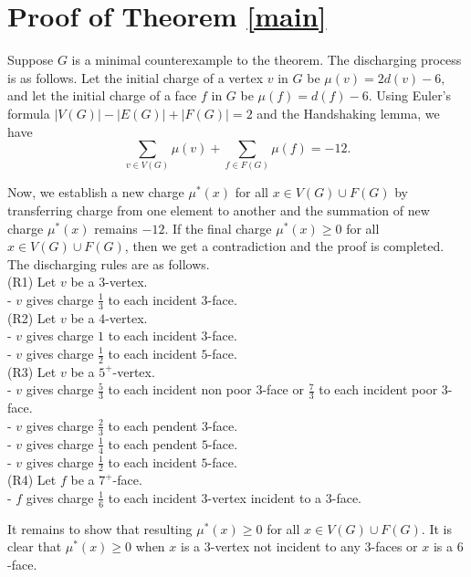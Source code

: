 \documentclass[11pt]{amsart} %
\theoremstyle{definition}
\begin{document}
\section{Proof of Theorem \ref{main}}

\indent Suppose $G$ is a minimal counterexample to the theorem. 
The discharging process is as follows. 
Let the initial charge of a vertex $v$ in $G$ be $\mu(v)=2d(v)-6,$ 
and let the initial charge of a face $f$ in $G$ be $\mu(f)=d(f)-6$. 
Using Euler's formula $|V(G)|-|E(G)|+|F(G)|=2$ 
and  the Handshaking lemma, we have
$$\displaystyle\sum_{v\in V(G)}\mu(v)
+\displaystyle\sum_{f\in F(G)}\mu(f)=-12.$$

\indent Now, we establish a new charge $\mu^*(x)$ 
for all $x\in V(G)\cup F(G)$ by transferring charge 
from one element to another and 
the summation of new charge $\mu^*(x)$ remains $-12.$  
If the final charge  $\mu^*(x)\geq 0$ for all $x\in V(G)\cup F(G)$, 
then we get a contradiction and the proof is completed.\\
\indent The discharging rules are as follows.\\
\noindent (R1) Let $v$ be a $3$-vertex. \\
- $v$ gives charge $\frac{1}{3}$ to each incident $3$-face. \\
\noindent (R2) Let $v$ be a $4$-vertex. \\
- $v$ gives charge $1$ to each incident $3$-face. \\
- $v$ gives charge $\frac{1}{2}$ to each incident $5$-face.\\
\noindent (R3) Let $v$ be a $5^+$-vertex. \\
- $v$ gives charge $\frac{5}{3}$ to each incident non poor $3$-face or $\frac{7}{3}$ to  each incident poor $3$-face. \\
- $v$ gives charge $\frac{2}{3}$ to each pendent $3$-face.\\
- $v$ gives charge $\frac{1}{4}$ to each pendent $5$-face.\\
- $v$ gives charge $\frac{1}{2}$ to each incident $5$-face.\\
\noindent (R4) Let $f$ be a $7^+$-face. \\
- $f$ gives charge $\frac{1}{6}$ to 
each incident $3$-vertex incident to a $3$-face.

\indent It remains to show that resulting $\mu^*(x)\geq 0$ 
for all $x\in V(G)\cup F(G)$. 
It is clear that $\mu^*(x)\geq 0$ 
when $x$ is a $3$-vertex not incident to any $3$-faces 
or $x$ is a $6$-face. 
\end{document}
